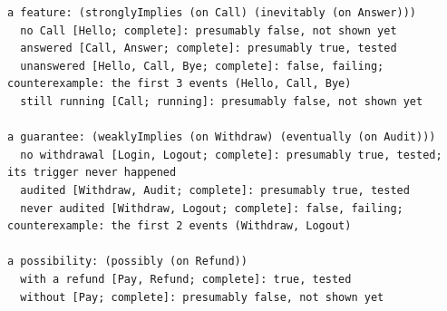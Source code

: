\begin{lstlisting}[language={},basicstyle=\ttfamily\footnotesize,breaklines=true]
a feature: (stronglyImplies (on Call) (inevitably (on Answer)))
  no Call [Hello; complete]: presumably false, not shown yet
  answered [Call, Answer; complete]: presumably true, tested
  unanswered [Hello, Call, Bye; complete]: false, failing; counterexample: the first 3 events (Hello, Call, Bye)
  still running [Call; running]: presumably false, not shown yet

a guarantee: (weaklyImplies (on Withdraw) (eventually (on Audit)))
  no withdrawal [Login, Logout; complete]: presumably true, tested; its trigger never happened
  audited [Withdraw, Audit; complete]: presumably true, tested
  never audited [Withdraw, Logout; complete]: false, failing; counterexample: the first 2 events (Withdraw, Logout)

a possibility: (possibly (on Refund))
  with a refund [Pay, Refund; complete]: true, tested
  without [Pay; complete]: presumably false, not shown yet
\end{lstlisting}
